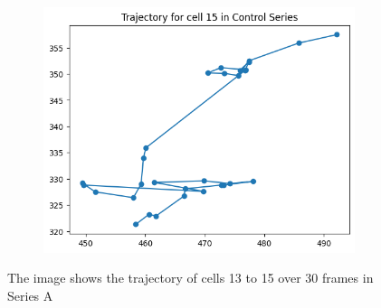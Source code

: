 \documentclass{article}
\begin{document}
\begin{figure}[h!]
    \begin{subfigure}[b]{0.5\linewidth}
        \centering
        \includegraphics[width=\linewidth]{Report/Appendix_Images/Trajectory-A-Control/trajectory_15.png}
    \end{subfigure}
    \caption{The image shows the trajectory of cells 13 to 15 over 30 frames in Series A}
    \label{fig:Trajectory-ControlSeries-13-15}
\end{figure}
\end{document}
